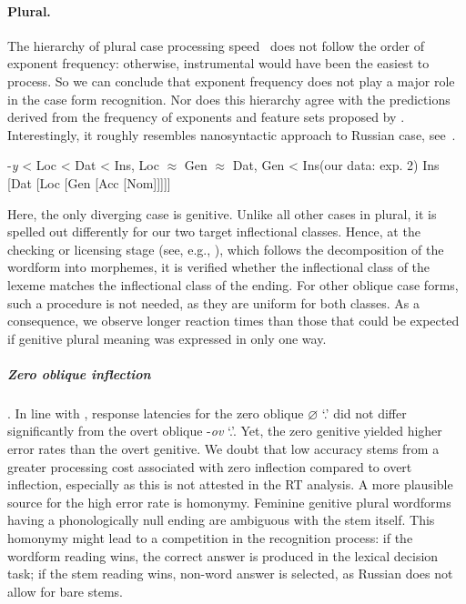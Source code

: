 \documentclass[output=paper, modfonts,newtxmath,hidelinks]{langscibook}
\begin{document}
\paragraph*{Plural.} The hierarchy of plural case processing speed~ does not follow the order of exponent frequency: otherwise, instrumental would have been the easiest to process. So we can conclude that exponent frequency does not play a major role in the case form recognition. Nor does this hierarchy agree with the predictions derived from the frequency of exponents and feature sets proposed by \citet{muller2004decomposing, wiese2004categories, wunderlich2004there}. Interestingly, it roughly resembles  nanosyntactic approach to Russian case, see~.

\ea \ea	\label{ex:plHierarchy} -\textit{y} < Loc < Dat < Ins, Loc $\approx$ Gen $\approx$ Dat, Gen < Ins\hfill (our data: exp. 2)
    \ex \label{ex:cahafunc} \ob Ins [Dat [Loc [Gen [Acc [Nom]]]]]\cb
    \z 
\z

\noindent Here, the only diverging case is genitive. Unlike all other cases in plural, it is spelled out differently for our two target inflectional classes. Hence, at the checking or licensing stage (see, e.g., \citealt{bertram2000role}), which follows the decomposition of the wordform into morphemes,  it is verified whether the inflectional class of the lexeme matches the inflectional class of the ending. For other oblique case forms, such a procedure is not needed, as they are uniform for both classes. As a consequence, we observe longer reaction times than those that could be expected if genitive plural meaning was expressed in only one way.

\subparagraph*{{Zero oblique inflection}}. In line with \citet{gor2017processing}, response latencies for the zero oblique \textit{$\varnothing$} `\genn.\pl' did not differ significantly from the overt oblique -\textit{ov} `\genn.\pl'. Yet, the zero genitive yielded higher error rates than the overt genitive. We doubt that low accuracy stems from a greater processing cost associated with zero inflection compared to overt inflection, especially as this is not attested in the RT analysis. A more plausible source for the high error rate is homonymy. Feminine genitive plural wordforms having a phonologically null ending are ambiguous with the stem itself. This homonymy might lead to a competition in the recognition process: if the wordform reading wins, the correct answer is produced in the lexical decision task; if the stem reading wins, non-word answer is selected, as Russian does not allow for bare stems.
\end{document}

